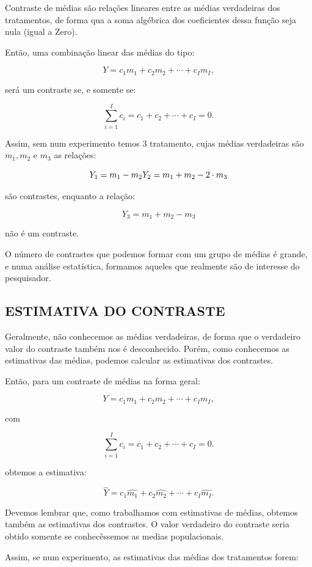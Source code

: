 \documentclass[
]{book}
\begin{document}
Contraste de médias são relações lineares entre as médias verdadeiras dos tratamentos, de forma qua a soma algébrica dos coeficientes dessa função seja nula (igual a Zero).

Então, uma combinação linear das médias do tipo:

\[
Y=c_1m_1+c_2m_2+ \cdots + c_Im_I,
\]

será um contraste se, e somente se:

\[
\sum_{i=1}^Ic_i=c_1+c_2+ \cdots +c_I = 0.
\]

Assim, sem num experimento temos 3 tratamento, cujas médias verdadeiras são \(m_1,m_2\) e \(m_3\) as relações:

\[
Y_1=m_1-m_2 \\
Y_2=m_1+m_2-2 \cdot m_3
\]

são contrastes, enquanto a relação:

\[
Y_3=m_1+m_2-m_3
\]

não é um contraste.

O número de contrastes que podemos formar com um grupo de médias é grande, e numa análise estatística, formamos aqueles que realmente são de interesse do pesquisador.

\hypertarget{estimativa-do-contraste}{%
\subsection{ESTIMATIVA DO CONTRASTE}\label{estimativa-do-contraste}}

Geralmente, não conhecemos as médias verdadeiras, de forma que o verdadeiro valor do contraste também nos é desconhecido. Porém, como conhecemos as estimativas das médias, podemos calcular as estimativas dos contrastes.

Então, para um contraste de médias na forma geral:

\[
Y=c_1m_1+c_2m_2+ \cdots + c_Im_I,
\]

com

\[
\sum_{i=1}^Ic_i=c_1+c_2+ \cdots +c_I = 0.
\]

obtemos a estimativa:

\[
\hat{Y}=c_1 \hat{m_1}+c_2 \hat{m_2}+ \cdots + c_I \hat{m_I}.
\]

Devemos lembrar que, como trabalhamos com estimativas de médias, obtemos também as estimativas dos contrastes. O valor verdadeiro do contraste seria obtido somente se conhecêssemos as medias populacionais.

Assim, se num experimento, as estimativas das médias dos tratamentos forem:
\end{document}
